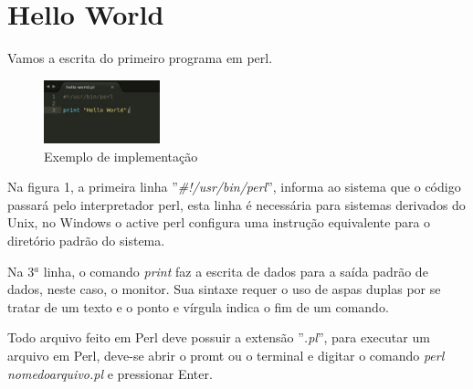 \chapter{Hello World}
Vamos a escrita do primeiro programa em perl.  

\begin{figure}[!htb]
	\centering
	\includegraphics[width=0.3\textwidth]{../5_figuras/image1}
	\caption{Exemplo de implementa\c{c}\~ao}
\end{figure}

Na figura 1, a primeira linha ''\textit{\#!/usr/bin/perl}'', informa ao sistema que o c\'odigo passar\'a pelo interpretador perl, esta linha \'e 
necess\'aria para sistemas derivados do Unix, no Windows  o active perl configura uma instru\c{c}\~ao equivalente para o diret\'orio padr\~ao do sistema. 

Na 3$^a$ linha, o comando \textit{print} faz a escrita de dados para a sa\'ida padr\~ao de dados, neste caso, o monitor.  Sua sintaxe requer o uso de aspas duplas
por se tratar de um texto e o ponto e v\'irgula indica o fim de um comando.

Todo arquivo feito em Perl deve possuir a extens\~ao ''\textit{.pl}'', para executar um arquivo em Perl, deve-se abrir o promt ou o terminal e digitar o 
comando \textit{perl nomedoarquivo.pl} e pressionar Enter.
 